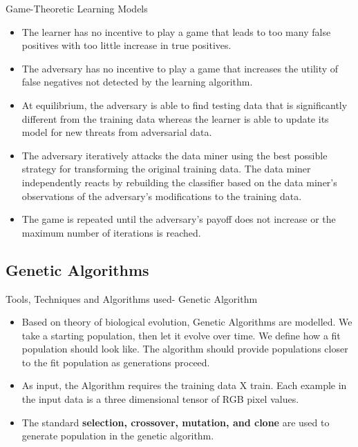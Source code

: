 \documentclass[10pt]{beamer}
\begin{document}
\begin{frame}{Game-Theoretic Learning Models}
	\begin{itemize}
		\item The learner has no incentive to play a game that leads to too many false positives with too little increase in true positives.  
		\item The adversary has no incentive to play a game that increases the utility of false negatives not detected by the learning algorithm. 
		\item At equilibrium, the adversary is able to find testing data that is significantly different from the training data whereas the learner is able to update its model for new threats from adversarial data.
		\item The adversary iteratively attacks the data miner using the best possible strategy for transforming the original training data. The data miner independently reacts by rebuilding the classifier based on the data miner’s observations of the adversary’s modifications to the training data.
		\item The game is repeated until the adversary’s payoff does not increase or the maximum number of iterations is reached. 
	\end{itemize}
\end{frame}


\subsection{Genetic Algorithms}

\begin{frame}{Tools, Techniques and Algorithms used- Genetic Algorithm}
	\begin{itemize}
        \item Based on theory of biological evolution, Genetic Algorithms are modelled. We take a starting population, then let it evolve over time. We define how a fit population should look like. The algorithm should provide populations closer to the fit population as generations proceed.
        \item As input, the Algorithm requires the training data X train. Each example in the input data is a three dimensional tensor of RGB pixel values. 
        \item The standard {\bf selection, crossover, mutation, and clone} are used to generate population in the genetic algorithm.
	\end{itemize}
\end{frame}
\end{document}

